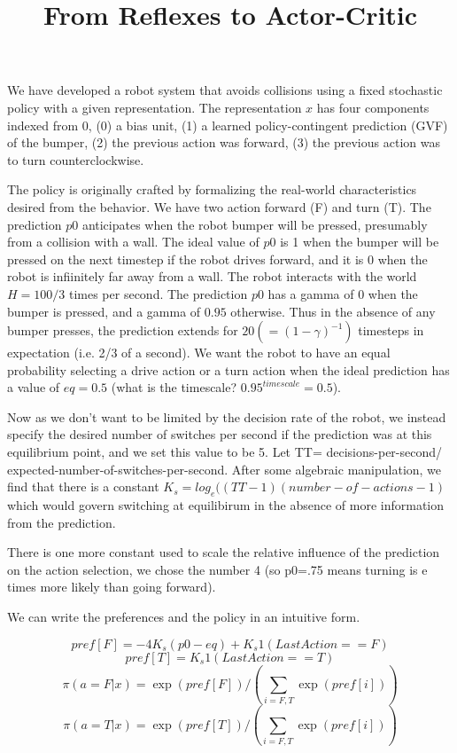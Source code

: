 \documentclass{article}
\begin{document}
\title{From Reflexes to Actor-Critic}
\maketitle

We have developed a robot system that avoids collisions using a fixed stochastic policy with a given representation.  The representation $x$ has four components indexed from 0, (0) a bias unit, (1) a learned policy-contingent prediction (GVF) of the bumper, (2) the previous action was forward, (3) the previous action was to turn counterclockwise.

The policy is originally crafted by formalizing the real-world characteristics desired from the behavior.  We have two action forward (F) and turn (T).  The prediction $p0$ anticipates when the robot bumper will be pressed, presumably from a collision with a wall.  The ideal value of $p0$ is 1 when the bumper will be pressed on the next timestep if the robot drives forward, and it is 0 when the robot is infiinitely far away from a wall.  The robot interacts with the world $H=100/3$ times per second.  The prediction $p0$ has a gamma of 0 when the bumper is pressed, and a gamma of $0.95$ otherwise.  Thus in the absence of any bumper presses, the prediction extends for $20 (= (1-\gamma)^{-1})$ timesteps in expectation (i.e. 2/3 of a second).  We want the robot to have an equal probability selecting a drive action or a turn action when the ideal prediction has a value of $eq=0.5$ (what is the timescale?  $0.95^{timescale} = 0.5$).

Now as we don't want to be limited by the decision rate of the robot, we instead specify the desired number of switches per second if the prediction was at this equilibrium point, and we set this value to be 5.  Let TT= decisions-per-second/ expected-number-of-switches-per-second.  After some algebraic manipulation, we find that there is a constant $K_s= log_{e}((TT-1)(number-of-actions-1)$ which would govern switching at equilibirum in the absence of more information from the prediction.

There is one more constant used to scale the relative influence of the prediction on the action selection, we chose the number 4 (so p0=.75 means turning is e times more likely than going forward).

We can write the preferences and the policy in an intuitive form.


\[ pref[F] = - 4 K_s( p0 - eq) + K_s 1(LastAction==F) \]
\[ pref[T] = K_s 1(LastAction==T) \]
\[ \pi( a=F | x) = \exp(pref[F]) / (\sum_{i=F,T} \exp(pref[i])) \]
\[ \pi( a=T | x) = \exp(pref[T]) / (\sum_{i=F,T} \exp(pref[i])) \]
\end{document}
